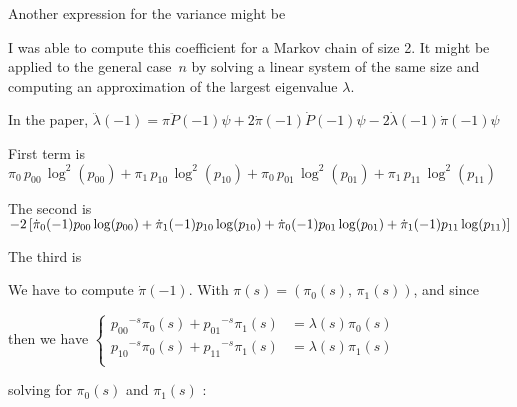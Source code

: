 
\noindent
Another expression for the variance might be


\noindent I was able to compute this coefficient for a Markov chain of size 2. It 
might be applied to the general case~$n$ by solving a linear system of the same size
and computing an approximation of the largest eigenvalue $\lambda$. 

\leftcenters
    {In the paper,}
    {$ \ddot{\lambda}(-1) = \pi \ddot{P}(-1)\psi
                        + 2 \dot{\pi}(-1) \dot{P}(-1) \psi
                        - 2 \dot{\lambda}(-1) \dot{\pi}(-1) \psi $}


\noindent First term is
\centers
    { $\pi_0 \, p_{0 0} \, \log^2 (p_{0 0}) 
        + \pi_1 \, p_{1 0} \, \log^2 (p_{1 0}) 
        + \pi_0 \, p_{0 1} \, \log^2 (p_{0 1}) 
        + \pi_1 \, p_{1 1} \, \log^2 (p_{1 1})  $}

\noindent The second is
\centers
    { $ - 2 \pac{
            \dot{\pi}_0(-1) p_{0 0} \log (p_{0 0})    
            + \dot{\pi}_1(-1) p_{1 0} \log (p_{1 0}) 
            + \dot{\pi}_0(-1) p_{0 1} \log (p_{0 1})
            + \dot{\pi}_1(-1) p_{1 1} \log (p_{1 1})
        }   
    $}

\noindent The third is

\noindent We 
        have to compute $\dot{\pi}(-1)$. With 
            $\pi(s) = (\pi_0(s), \, \pi_1(s))$, and since


\leftcenters
    {then we have}
    {$ \left\{
        \begin{aligned}
            {p_{0 0}}^{-s} \pi_0(s) + {p_{0 1}}^{-s} \pi_1(s) &= \lambda(s) \pi_0(s) \\
            {p_{1 0}}^{-s} \pi_0(s) + {p_{1 1}}^{-s} \pi_1(s) &= \lambda(s) \pi_1(s) \\
        \end{aligned}
        \right.
     $}

\noindent
solving for $\pi_0(s)$ and $\pi_1(s)$ :


